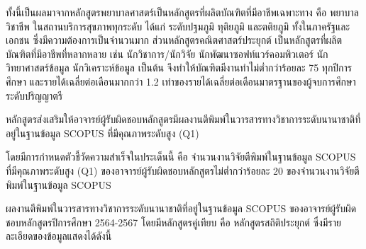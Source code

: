 ทั้งนี้เป็นผลมาจากหลักสูตรพยาบาลศาสตร์เป็นหลักสูตรที่ผลิตบัณฑิตที่มีอาชีพเฉพาะทาง คือ พยาบาลวิชาชีพ ในสถานบริการสุขภาพทุกระดับ ได้แก่ ระดับปฐมภูมิ ทุติยภูมิ และตติยภูมิ ทั้งในภาครัฐและเอกชน ซึ่งมีความต้องการเป็นจำนวนมาก ส่วนหลักสูตรคณิตศาสตร์ประยุกต์ เป็นหลักสูตรที่ผลิตบัณฑิตที่มีอาชีพที่หลากหลาย เช่น นักวิชาการ/นักวิจัย นักพัฒนาซอฟท์แวร์คอมพิวเตอร์ นักวิทยาศาสตร์ข้อมูล นักวิเคราะห์ข้อมูล เป็นต้น จึงทำให้บัณฑิตมีงานทำไม่ต่ำกว่าร้อยละ 75  ทุกปีการศึกษา
และรายได้เฉลี่ยต่อเดือนมากกว่า 1.2 เท่าของรายได้เฉลี่ยต่อเดือนมาตรฐานของผู้จบการศึกษาระดับปริญญาตรี 

\begin{doclist}
\end{doclist}

หลักสูตรส่งเสริมให้อาจารย์ผู้รับผิดชอบหลักสูตรมีผลงานตีพิมพ์ในวารสารทางวิชาการระดับนานาชาติที่อยู่ในฐานข้อมูล SCOPUS ที่มีคุณภาพระดับสูง (Q1) 

โดยมีการกำหนดตัวชี้วัดความสำเร็จในประเด็นนี้ คือ จำนวนงานวิจัยตีพิมพ์ในฐานข้อมูล SCOPUS ที่มีคุณภาพระดับสูง (Q1) ของอาจารย์ผู้รับผิดชอบหลักสูตรไม่ต่ำกว่าร้อยละ 20 ของจำนวนงานวิจัยตีพิมพ์ในฐานข้อมูล SCOPUS

ผลงานตีพิมพ์ในวารสารทางวิชาการระดับนานาชาติที่อยู่ในฐานข้อมูล SCOPUS ของอาจารย์ผู้รับผิดชอบหลักสูตรปีการศึกษา 2564-2567 โดยมีหลักสูตรคู่เทียบ คือ หลักสูตรสถิติประยุกต์  ซึ่งมีรายละเอียดของข้อมูลแสดงได้ดังนี้

